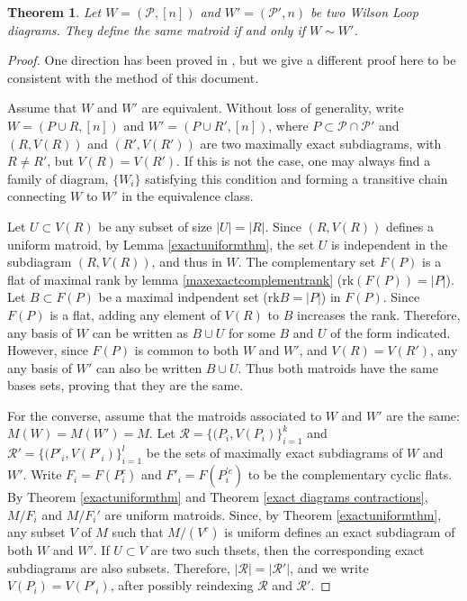 \documentclass[11pt]{article}
\newcommand{\rk}{\textrm{rk} }
\newcommand{\cP}{\mathcal{P}}
\newtheorem{thm}{Theorem}[section]
\theoremstyle{remark}
\theoremstyle{definition}
\begin{document}
\begin{thm}\label{same matroid iff equiv}
Let $W= (\cP, [n])$ and $W'= (\cP', n)$ be two Wilson Loop diagrams. They define the same matroid if and only if $W \sim W'$.
\end{thm}

\begin{proof}
One direction has been proved in \cite[Theorem 1.18]{wilsonloop}, but we give a different proof here to be consistent with the method of this document.

Assume that $W$ and $W'$ are equivalent. Without loss of generality, write $W = (P \cup R, [n])$ and $W' = (P \cup R', [n])$, where $P \subset \cP \cap \cP'$ and $(R, V(R))$ and $(R', V(R'))$ are two maximally exact subdiagrams, with $R \neq R'$, but $V(R) = V(R')$. If this is not the case, one may always find a family of diagram, $\{W_i\}$ satisfying this condition and forming a transitive chain connecting $W$ to $W'$ in the equivalence class.

Let $U \subset V(R)$ be any subset of size $|U| = |R|$. Since $(R, V(R))$ defines a uniform matroid, by Lemma \ref{exactuniformthm}, the set $U$ is independent in the subdiagram $(R, V(R))$, and thus in $W$. The complementary set $F(P)$ is a flat of maximal rank by lemma \ref{maxexactcomplementrank} ($\rk(F(P)) = |P|$). Let $B \subset F(P)$ be a maximal indpendent set ($\rk B = |P|$) in $F(P)$. Since $F(P)$ is a flat, adding any element of $V(R)$ to $B$ increases the rank. Therefore, any basis of $W$ can be written as $B \cup U$ for some $B$ and $U$ of the form indicated. However, since $F(P)$ is common to both $W$ and $W'$, and $V(R) = V(R')$, any any basis of $W'$ can also be written $B \cup U$. Thus both matroids have the same bases sets, proving that they are the same.

For the converse, assume that the matroids associated to $W$ and $W'$ are the same: $M(W) = M(W')= M$. Let $\mathcal{R} = \{(P_i, V(P_i)\}_{i=1}^k$ and $\mathcal{R}' = \{(P'_i, V(P'_i)\}_{i=1}^l$ be the sets of maximally exact subdiagrams of $W$ and $W'$. Write $F_i = F(P_i^c)$ and $F'_i = F(P^{'c}_i)$ to be the complementary cyclic flats. By Theorem \ref{exactuniformthm} and Theorem \ref{exact diagrams contractions},  $M/F_i$ and $M/F_i'$ are uniform matroids. Since, by Theorem \ref{exactuniformthm}, any subset $V$ of $M$ such that $M/(V^c)$ is uniform defines an exact subdiagram of both $W$ and $W'$. If $U \subset V$ are two such thsets, then the corresponding exact subdiagrams are also subsets. Therefore, $|\mathcal{R}| = |\mathcal{R}'|$, and we write $V(P_i) = V(P'_i)$, after possibly reindexing $\mathcal{R}$ and $\mathcal{R}'$.


\end{proof}
\end{document}

